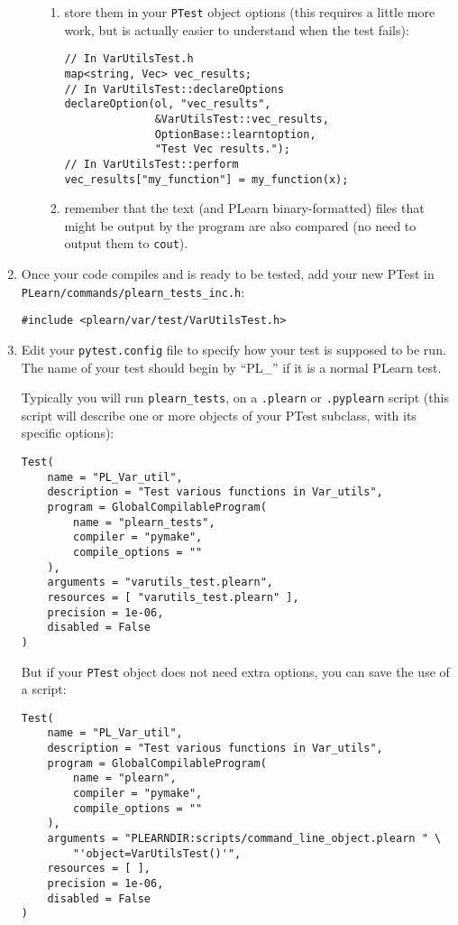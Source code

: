 \documentclass[11pt]{book}
\begin{document}
\begin{enumerate}
\begin{itemize}
\begin{enumerate}
      \item store them in your {\tt PTest} object options (this requires
      a little more work, but is actually easier to understand when the
      test fails):
\begin{verbatim}
// In VarUtilsTest.h
map<string, Vec> vec_results;
// In VarUtilsTest::declareOptions
declareOption(ol, "vec_results",
              &VarUtilsTest::vec_results,
              OptionBase::learntoption,
              "Test Vec results.");
// In VarUtilsTest::perform
vec_results["my_function"] = my_function(x);
\end{verbatim}

      \item remember that the text (and PLearn binary-formatted)
      files that might be output by the program are also compared (no
      need to output them to {\tt cout}).
    \end{enumerate}
  \end{itemize}

  \item Once your code compiles and is ready to be tested, add your new
  PTest in {\tt PLearn/commands/plearn\_tests\_inc.h}:
\begin{verbatim}
#include <plearn/var/test/VarUtilsTest.h>
\end{verbatim}

  \item
  Edit your {\tt pytest.config} file to specify how your test is
  supposed to be run. The name of your test should begin by ``PL\_'' if
  it is a normal PLearn test.

    Typically you will run {\tt plearn\_tests}, on a {\tt .plearn}
    or {\tt .pyplearn} script (this script will describe one or more
    objects of your PTest subclass, with its specific options):
\begin{verbatim}
Test(
    name = "PL_Var_util",
    description = "Test various functions in Var_utils",
    program = GlobalCompilableProgram(
        name = "plearn_tests",
        compiler = "pymake",
        compile_options = ""
    ),
    arguments = "varutils_test.plearn",
    resources = [ "varutils_test.plearn" ],
    precision = 1e-06,
    disabled = False
)
\end{verbatim}

    But if your {\tt PTest} object does not need extra options,
    you can save the use of a script:
\begin{verbatim}
Test(
    name = "PL_Var_util",
    description = "Test various functions in Var_utils",
    program = GlobalCompilableProgram(
        name = "plearn",
        compiler = "pymake",
        compile_options = ""
    ),
    arguments = "PLEARNDIR:scripts/command_line_object.plearn " \
        "'object=VarUtilsTest()'",
    resources = [ ],
    precision = 1e-06,
    disabled = False
)
\end{verbatim}


\end{enumerate}
\end{document}
